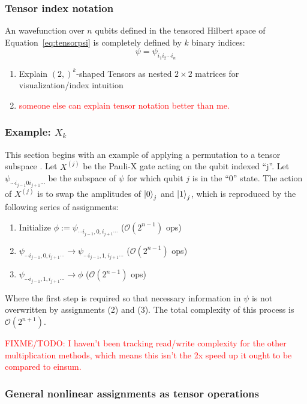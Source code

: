 \documentclass{article}
\begin{document}
\subsubsection{Tensor index notation}

An wavefunction over $n$ qubits defined in the tensored Hilbert space of Equation~\ref{eq:tensorpsi} is completely defined by $k$ binary indices:
$$
\psi = \psi_{i_1 i_2 \cdots i_n}
$$

\begin{enumerate}
	\item Explain $(2,)^k$-shaped Tensors as nested $2\times 2$ matrices for visualization/index intuition
	\item \textcolor{red}{someone else can explain tensor notation better than me.}
\end{enumerate}


\subsubsection{Example: $X_k$}\label{sec:Xj}
\label{sec:clifford_example}
This section begins with an example of applying a permutation to a tensor subspace . Let $X^{(j)}$ be the Pauli-X gate acting on the qubit indexed ``j''. Let $\psi_{\cdots i_{j-1} 0 i_{j+1} \cdots}$ be the subspace of $\psi$ for which qubit $j$ is in the ``0'' state. The action of $X^{(j)}$ is to swap the amplitudes of $\ket{0}_j$ and $\ket{1}_j$, which is reproduced by the following series of assignments:
\begin{enumerate}
	\item Initialize $\phi := \psi_{\cdots i_{j-1} ,0 ,i_{j+1} \cdots}$ ($\mathcal{O}(2^{n-1})$ ops)
	\item $\psi_{\cdots i_{j-1} ,0, i_{j+1} \cdots} \rightarrow \psi_{\cdots i_{j-1} ,1 ,i_{j+1} \cdots}$ ($\mathcal{O}(2^{n-1})$ ops)
	\item $\psi_{\cdots i_{j-1} ,1, i_{j+1} \cdots} \rightarrow \phi$ ($\mathcal{O}(2^{n-1})$ ops)
\end{enumerate}
Where the first step is required so that necessary information in $\psi$ is not overwritten by assignments (2) and (3). The total complexity of this process is $\mathcal{O}(2^{n+1})$.

\textcolor{red}{FIXME/TODO: I haven't been tracking read/write complexity for the other multiplication methods, which means this isn't the 2x speed up it ought to be compared to einsum.}



\subsubsection{General nonlinear assignments as tensor operations}
	
\end{document}
